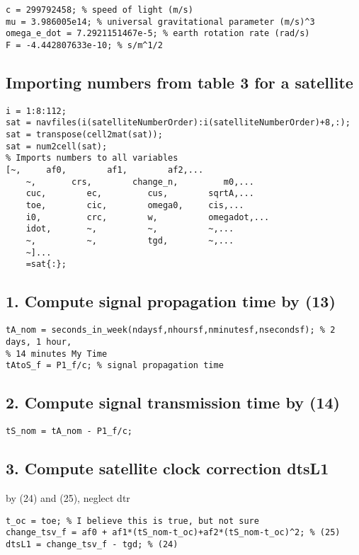 \begin{verbatim}
c = 299792458; % speed of light (m/s)
mu = 3.986005e14; % universal gravitational parameter (m/s)^3
omega_e_dot = 7.2921151467e-5; % earth rotation rate (rad/s)
F = -4.442807633e-10; % s/m^1/2
\end{verbatim}


\subsection*{Importing numbers from table 3 for a satellite}

\begin{verbatim}
i = 1:8:112;
sat = navfiles(i(satelliteNumberOrder):i(satelliteNumberOrder)+8,:);
sat = transpose(cell2mat(sat));
sat = num2cell(sat);
% Imports numbers to all variables
[~,     af0,        af1,        af2,...
    ~,       crs,        change_n,         m0,...
    cuc,        ec,         cus,        sqrtA,...
    toe,        cic,        omega0,     cis,...
    i0,         crc,        w,          omegadot,...
    idot,       ~,          ~,          ~,...
    ~,          ~,          tgd,        ~,...
    ~]...
    =sat{:};
\end{verbatim}


\subsection*{1. Compute signal propagation time by (13)}

\begin{verbatim}
tA_nom = seconds_in_week(ndaysf,nhoursf,nminutesf,nsecondsf); % 2 days, 1 hour,
% 14 minutes My Time
tAtoS_f = P1_f/c; % signal propagation time
\end{verbatim}


\subsection*{2. Compute signal transmission time by (14)}

\begin{verbatim}
tS_nom = tA_nom - P1_f/c;
\end{verbatim}


\subsection*{3. Compute satellite clock correction dtsL1}

\begin{par}
by (24) and (25), neglect dtr
\end{par} \vspace{1em}
\begin{verbatim}
t_oc = toe; % I believe this is true, but not sure
change_tsv_f = af0 + af1*(tS_nom-t_oc)+af2*(tS_nom-t_oc)^2; % (25)
dtsL1 = change_tsv_f - tgd; % (24)
\end{verbatim}


